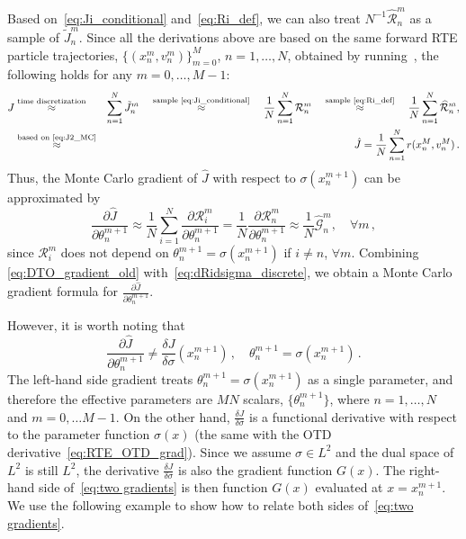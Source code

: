 \documentclass[12pt]{amsart}
\begin{document}
Based on~\eqref{eq:Ji_conditional} and~\eqref{eq:Ri_def}, we can also treat $N^{-1} \widehat {\mathcal{R}}_n^m$ as a sample of $\tilde{J}^m_n$. Since all the derivations above are based on the same forward RTE particle trajectories, $\{(x_n^m, v_n^m)\}_{m=0}^M$, $n = 1,\ldots, N$, obtained by running~, the following holds for any $m = 0,\ldots, M-1$:
\begin{eqnarray*}
J & \stackrel{\text{time discretization}}{\approx} & \sum_{n=1}^N \tilde{J}^m_n \quad  \stackrel{\text{sample~\eqref{eq:Ji_conditional}}}{\approx} \quad \frac{1}{N}\sum_{n=1}^N  {\mathcal{R}}_n^m \quad  \stackrel{\text{sample~\eqref{eq:Ri_def}}}\approx \quad   \frac{1}{N}\sum_{n=1}^N \widehat {\mathcal{R}}_n^m,\\
  &\stackrel{\text{based on~\eqref{eq:J2_MC}}}\approx& \hat J  = \frac{1}{N}\sum_{n=1}^N r(x_n^M, v_n^M)\,.
\end{eqnarray*}
Thus, the Monte Carlo gradient  of  $\hat J$ with respect to $\sigma(x_n^{m+1})$ can be approximated by
\begin{equation}\label{eq:DTO_gradient_old}
\frac{\partial \hat J }{\partial  \theta_n^{m+1}  }\approx \frac{1}{N} \sum_{i=1}^N \frac{\partial  {\mathcal{R}}_{i}^m }{\partial  \theta_n^{m+1}  }  = \frac{1}{N} \frac{\partial \mathcal{R}_n^m }{\partial  \theta_n^{m+1}  } \approx  \frac{1}{N}\widehat{\mathcal{G}}_n^m,\quad \forall m\,,
\end{equation}
since $\mathcal{R}_{i}^{m}$ does not depend on $ \theta_n^{m+1} 
 = \sigma(x_n^{m+1})$ if $i\neq n$, $\forall m$. Combining \eqref{eq:DTO_gradient_old} with~\eqref{eq:dRidsigma_discrete}, we obtain a Monte Carlo gradient formula for $\frac{\partial \hat J }{\partial \theta_n^{m+1} }$.


However, it is worth noting that 
\begin{equation}\label{eq:two gradients}
 \frac{\partial \hat{J}}{\partial \theta_n^{m+1} }\neq \frac{\delta J}{\delta \sigma}(x_n^{m+1})\,, \quad \theta_n^{m+1} = \sigma(x_n^{m+1})\,.
\end{equation}
The left-hand side gradient treats $\theta_n^{m+1} = \sigma(x_n^{m+1})$ as a single parameter, and therefore the effective parameters are $MN$ scalars, $\{\theta_n^{m+1}\}$, where $n=1,\ldots,N$ and $m = 0,\ldots M-1$. On the other hand, $\frac{\delta J}{\delta \sigma}$ is a functional derivative with respect to the parameter function $\sigma(x)$ (the same with the OTD derivative~\eqref{eq:RTE_OTD_grad}). Since we assume $\sigma\in L^2$ and the dual space of $L^2$ is still $L^2$, the derivative $\frac{\delta J}{\delta \sigma}$ is also the gradient function $G(x)$. The right-hand side of~\eqref{eq:two gradients} is then function $G(x)$ evaluated at $x= x_n^{m+1}$. We use the following example to show how to relate both sides of~\eqref{eq:two gradients}.
\end{document}
